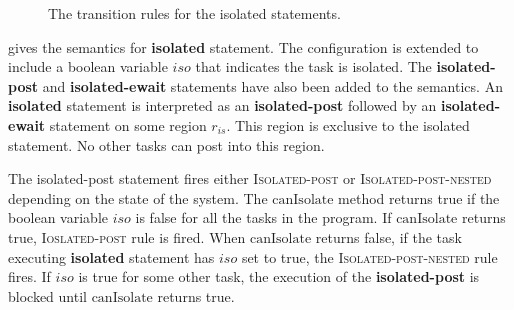 \begin{figure}
\begin{center}
  \end{center}
  \caption{The transition rules for the isolated statements.}
  \label{fig:isol-semantics}
\end{figure}

 gives the semantics for \textbf{isolated} statement. The configuration is extended to include a boolean variable $iso$ that indicates the task is isolated. The \textbf{isolated-post} and \textbf{isolated-ewait} statements have also been added to the semantics. An \textbf{isolated} statement is interpreted as an \textbf{isolated-post} followed by an \textbf{isolated-ewait} statement on some region $r_{is}$. This region is exclusive to the isolated statement. No other tasks can post into this region.

The isolated-post statement fires either \textsc{Isolated-post} or \textsc{Isolated-post-nested} depending on the state of the system. The $\mathrm{canIsolate}$ method returns true if the boolean variable $iso$ is false for all the tasks in the program. If $\mathrm{canIsolate}$ returns true, \textsc{Ioslated-post} rule is fired. When $\mathrm{canIsolate}$ returns false, if the task executing \textbf{isolated} statement has $iso$ set to true, the \textsc{Isolated-post-nested} rule fires. If $iso$ is true for some other task, the execution of the \textbf{isolated-post} is blocked until $\mathrm{canIsolate}$ returns true.


